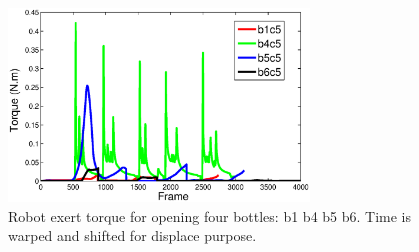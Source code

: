 \begin{figure}
  \centering
  \includegraphics[width=8cm]{./fig/rb1b4b5b6_time_T.eps}
  \caption{ \scriptsize{Robot exert torque for opening four bottles: b1 b4 b5 b6. Time is warped and shifted for displace purpose.}
}
\label{fig:demo_b1b4b5b6}
\end{figure}




%
%
